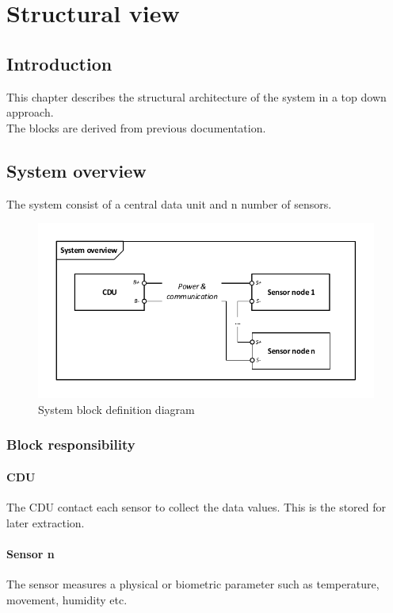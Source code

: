 \chapter{Structural view}

\section{Introduction}
This chapter describes the structural architecture of the system in a top down approach.\\
The blocks are derived from previous documentation.


\section{System overview}
The system consist of a central data unit and n number of sensors.
\begin{figure}[hbpt]
\centering
\includegraphics[width=.9\textwidth]{billeder/systembdd}
\caption{System block definition diagram}
\label{systembdd}
\end{figure}

\subsection{Block responsibility}
\subsubsection{CDU}
The CDU contact each sensor to collect the data values. This is the stored for later extraction.

\subsubsection{Sensor n}
The sensor measures a physical or biometric parameter such as temperature, movement, humidity etc.



